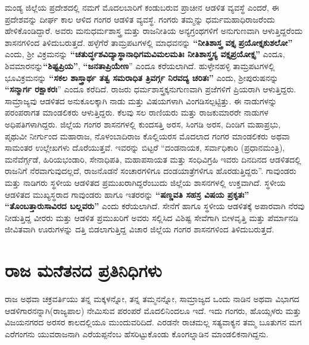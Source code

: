ಮಂಡ್ಯ ಜಿಲ್ಲೆಯ ಪ್ರದೇಶದಲ್ಲಿ ನಮಗೆ ಮೊದಲಬಾರಿಗೆ ಕಂಡುಬರುವ ಪ್ರಾಚೀನ ಆಡಳಿತ ವ್ಯವಸ್ಥೆ ಎಂದರೆ, ಈ ಪ್ರದೇಶವನ್ನು ದೀರ್ಘ ಕಾಲ ಆಳಿದ ಗಂಗರ ಆಡಳಿತ ವ್ಯವಸ್ಥೆ. ಗಂಗರು ತಮ್ಮನ್ನು ಧರ್ಮಮಹಾಧಿರಾಜರೆಂದು ಹೇಳಿಕೊಂಡಿದ್ದಾರೆ. ಅವರು ಮನುಧರ್ಮಶಾಸ್ತ್ರ ಮತ್ತು ರಾಜನೀತಿಯ ಅನ್ಯಗ್ರಂಥಗಳಿಗೆ ಅನುಗುಣವಾಗಿ ಆಳುತ್ತಿದ್ದರೆಂದು ಶಾಸನಗಳಿಂದ ತಿಳಿದುಬರುತ್ತದೆ. ಹಳ್ಳೆಗೆರೆ ತಾಮ್ರಪಟಗಳಲ್ಲಿ ಮಾಧವನನ್ನು \textbf{“ನೀತಿಶಾಸ್ತ್ರ ವಕ್ತೃ ಪ್ರಯೋಕ್ತೃಕುಶಲೋ”} ಎಂದು, ಶ‍್ರೀ ವಿಕ್ರಮನನ್ನು \textbf{“ಚತುರ್ದ್ಧಶವಿದ್ಯಾಸ್ಥಾನಾಧಿಗಮವಿಮಲಮತಿಃ ನೀತಿಶಾಸ್ತ್ರಸ್ಯ ವಕ್ತೃಪ್ರಯೋಕ್ತೃ”} ಎಂದೂ, ಶಿವಮಾರನನ್ನು\break \textbf{“ಶಿಷ್ಟಪ್ರಿಯ”}, \textbf{“ಜನತಾಪ್ರಿಯೇಣ}” ಎಂದೂ ಕರೆಯಲಾಗಿದೆ. ಹುಳ್ಳೇನಹಳ್ಳಿ ತಾಮ್ರಪಟಗಳಲ್ಲಿ ಭೂವಿಕ್ರಮನನ್ನು \textbf{“ಸಕಲ ಶಾಸ್ತ್ರಾರ್ಥ ತತ್ವ ಸಮರಾಧಿತ ತ್ರಿವರ್ಗ್ಗ ನಿರವದ್ಯ ಚರಿತಃ”} ಎಂದು, ಶ‍್ರೀಪುರುಷನನ್ನು \textbf{“ಸನ್ಮಾರ್ಗ ರಕ್ಷಾಕರಃ}” ಎಂದೂ ಕರೆದಿದೆ. ರಾಜರು ಧರ್ಮಶಾಸ್ತ್ರಕ್ಕನುಗುಣವಾಗಿ ಪ್ರಜೆಗಳಿಗೆ ಪ್ರಿಯರಾಗಿ ಆಳುತ್ತಿದ್ದರು. ಸಾಮ್ರಾಜ್ಯವು ಆಡಳಿತದ ಅನುಕೂಲಕ್ಕಾಗಿ ನಾಡು ಮತ್ತು ವಿಷಯಗಳಾಗಿ ವಿಂಗಡಿಸಲ್ಪಟ್ಟಿತ್ತು. ಈ ನಾಡುಗಳನ್ನು ಪರಂಪರಾಗತ ಮಾಂಡಲಿಕರು ಆಳುತ್ತಿದ್ದರು. ಕೆಲವು ಸಲ ರಾಣಿಯರು ಮತ್ತು ರಾಜಕುಮಾರರೇ ನಾಡುಗಳ ಅಧಿಪತಿಗಳಾಗಿದ್ದರು. ಜಿಲ್ಲೆಯ ಗಂಗರ ಶಾಸನಗಳಲ್ಲಿ ಕುಂದಸತ್ತಿ ಅರಸ, ಸಿಂಗಡಿ ಅರಸ, ದಿಂಡಿಗ ಮಹಾಪ್ರಭು, ಪೃಥುವೀ ನೀರ್ಗುಂದ ಮಹಾರಾಜ, ನೊಳಂಬಾದಿರಾಜ ಕೊಲ್ಲಿಯರಸ ಮೊದಲಾದ ಗಂಗರ ಮಾಂಡಲಿಕರು ಅಥವಾ ಸಾಮಂತರ ಉಲ್ಲೇಖಗಳು ದೊರೆಯುತ್ತವೆ. ಇವರನ್ನು ಬಿಟ್ಟರೆ “ದಂಡನಾಯಕ, ಸರ್ವಾಧಿಕಾರಿ (ಪ್ರಧಾನಮಂತ್ರಿ), ಮನೆವೆರ್ಗ್ಗಡೆ, ಹಿರಿಯಭಂಡಾರಿ, ಸೇನಾಧಿಪತಿ, ಮಹಾಪಸಾಯತ ಮತ್ತು ಸಂಧಿವಿಗ್ರಹಿ ಇವರು ದಿನದಿನದ ಆಡಳಿತದಲ್ಲಿ ರಾಜನಿಗೆ ನೆರವಾಗುವುದಲ್ಲದೆ, ರಾಜನೊಡನೆ ಸಂಚಾರಗಳಿಗೂ ದಂಡಯಾತ್ರೆಗಳಿಗೂ ಹೊರಡುತ್ತಿದ್ದರು''. ಗಾವುಂಡರು ಮತ್ತು ನಾಡಿಗರು ಸ್ಥಳೀಯ ಆಡಳಿತದ ಪ್ರಮುಖರಾಗಿದ್ದರೆಂಬುದು ಜಿಲ್ಲೆಯ ಶಾಸನಗಳಲ್ಲಿ ಉಕ್ತವಾಗಿದೆ. ಸ್ಥಳೀಯ ಆಡಳಿತದ ಮುಖ್ಯಸ್ಥರಾದ ಗಾವುಂಡರು ಹಾಗೂ ಇತರರನ್ನು \textbf{“ಷಣ್ಣವತಿ ಸಹಸ್ರ ವಿಷಯ ಪ್ರಕೃತಃ” “ತೊಂಬತ್ತಾರುಸಾವಿರದ ಬಲ್ಲವರು”} ಎಂದು ಕರೆಯಲಾಗಿದೆ. ಸೇನೆಗೆ ಹಾಗೂ ಸ್ಥಳೀಯ ಆಡಳಿತಕ್ಕೆ ಅಪಾರವಾಗಿ ನೆರವು ನೀಡುತ್ತಿದ್ದ ವೀರರು ಮತ್ತು ಆಡಳಿತ ಪ್ರಮುಖರಿಗೆ ಅವರು ಸಲ್ಲಿಸಿದ ವಿಶಿಷ್ಟ ಸೇವೆಗಾಗಿ ಬೀಳವೃತ್ತಿ ಮತ್ತು ಪೆರ್ಮಾನಡಿ ಜೀವಿತವಾಗಿ ಊರುಗಳನ್ನು ದತ್ತಿ ಬಿಡಲಾಗುತ್ತಿದ್ದ ವಿಚಾರ ಜಿಲ್ಲೆಯ ಗಂಗರ ಶಾಸನಗಳಿಂದ ತಿಳಿದುಬರುತ್ತದೆ.

\section{ರಾಜ ಮನೆತನದ ಪ್ರತಿನಿಧಿಗಳು}

ರಾಜ ಅಥವಾ ಚಕ್ರವರ್ತಿಯು ತನ್ನ ಮಕ್ಕಳನ್ನೋ, ತನ್ನ ತಮ್ಮನನ್ನೋ, ಸಾಮ್ರಾಜ್ಯದ ಒಂದು ನಾಡಿನ ಅಥವಾ ವಿಭಾಗದ ಆಡಳಿಗಾರನನ್ನಾಗಿ(ರಾಜ್ಯಪಾಲ) ನೇಮಿಸುವ ಪರಂಪರೆ ಮೊದಲಿನಿಂದಲೂ ಇದೆ. ಇದು ಗಂಗರು, ಹೊಯ್ಸಳರು ಮತ್ತು ವಿಜಯನಗರದ ಅರಸರ ಕಾಲದಲ್ಲಿಯೂ ಮುಂದುವರಿದಿದೆ. ಎರಡನೇ ರಾಚಮಲ್ಲ ಸತ್ಯವಾಕ್ಯನ ತಮ್ಮ ಬೂತುಗನ ಮಗ ಎರೆಗಂಗನು ಯುವರಾಜನಾಗಿ ಎರೆಯಪ್ಪನೆಂಬ ಹೆಸರಿಟ್ಟುಕೊಂಡು ಕೊಂಗಲ್ನಾಡಿನ ಮಾಂಡಲಿಕನಾಗಿದ್ದನು.

